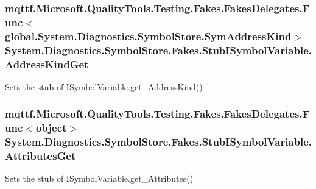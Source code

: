 \hypertarget{class_system_1_1_diagnostics_1_1_symbol_store_1_1_fakes_1_1_stub_i_symbol_variable_ad0ff09452c6222a0abbe267b84b1f1ed}{
\subsubsection[{Address\-Kind\-Get}]{\setlength{\rightskip}{0pt plus 5cm}mqttf.\-Microsoft.\-Quality\-Tools.\-Testing.\-Fakes.\-Fakes\-Delegates.\-Func$<$global.\-System.\-Diagnostics.\-Symbol\-Store.\-Sym\-Address\-Kind$>$ System.\-Diagnostics.\-Symbol\-Store.\-Fakes.\-Stub\-I\-Symbol\-Variable.\-Address\-Kind\-Get}}\label{class_system_1_1_diagnostics_1_1_symbol_store_1_1_fakes_1_1_stub_i_symbol_variable_ad0ff09452c6222a0abbe267b84b1f1ed}


Sets the stub of I\-Symbol\-Variable.\-get\-\_\-\-Address\-Kind()

\hypertarget{class_system_1_1_diagnostics_1_1_symbol_store_1_1_fakes_1_1_stub_i_symbol_variable_a972ca8769d355609be455fe6c7e36244}{
\subsubsection[{Attributes\-Get}]{\setlength{\rightskip}{0pt plus 5cm}mqttf.\-Microsoft.\-Quality\-Tools.\-Testing.\-Fakes.\-Fakes\-Delegates.\-Func$<$object$>$ System.\-Diagnostics.\-Symbol\-Store.\-Fakes.\-Stub\-I\-Symbol\-Variable.\-Attributes\-Get}}\label{class_system_1_1_diagnostics_1_1_symbol_store_1_1_fakes_1_1_stub_i_symbol_variable_a972ca8769d355609be455fe6c7e36244}


Sets the stub of I\-Symbol\-Variable.\-get\-\_\-\-Attributes()

